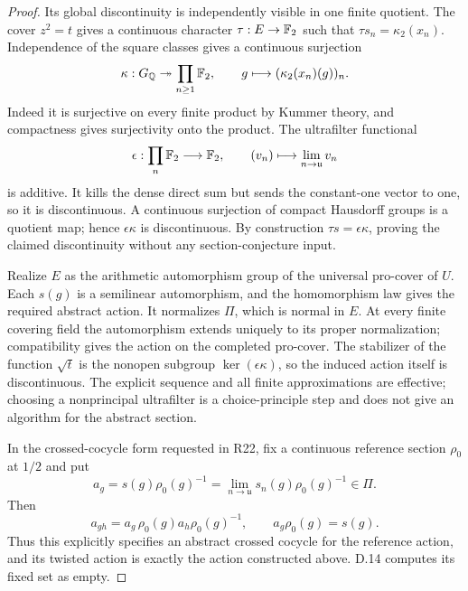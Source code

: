 \begin{proof}
Its global discontinuity is independently visible in one
finite quotient. The cover $z^2=t$ gives a continuous character
$\tau:E\to\mathbb F_2$ such that
$\tau s_n=\kappa_2(x_n)$. Independence of the square classes
gives a continuous surjection
\[
 \kappa:G_\mathbb Q\twoheadrightarrow\prod_{n\geq1}\mathbb F_2,
                 \qquad g\longmapsto(\kappa_2(x_n)(g))_n.
\]
Indeed it is surjective on every finite product by Kummer
theory, and compactness gives surjectivity onto the product.
The ultrafilter functional
\[
 \epsilon:\prod_n\mathbb F_2\longrightarrow\mathbb F_2,
              \qquad (v_n)\longmapsto\lim_{n\to\mathfrak u}v_n
\]
is additive. It kills the dense direct sum but sends the
constant-one vector to one, so it is discontinuous. A
continuous surjection of compact Hausdorff groups is a
quotient map; hence $\epsilon\kappa$ is discontinuous.
By construction $\tau s=\epsilon\kappa$, proving the
claimed discontinuity without any section-conjecture input.

Realize $E$ as the arithmetic automorphism group of the
universal pro-cover of $U$. Each $s(g)$ is a semilinear
automorphism, and the homomorphism law gives the required
abstract action. It normalizes $\Pi$, which is normal in
$E$. At every finite covering field the automorphism extends
uniquely to its proper normalization; compatibility gives
the action on the completed pro-cover. The stabilizer of the
function $\sqrt t$ is the nonopen subgroup
$\ker(\epsilon\kappa)$, so the induced action itself is
discontinuous. The explicit sequence and all finite
approximations are effective; choosing a nonprincipal
ultrafilter is a choice-principle step and does not give an
algorithm for the abstract section.

In the crossed-cocycle form requested in R22, fix a continuous
reference section $\rho_0$ at $1/2$ and put
\[
 a_g=s(g)\rho_0(g)^{-1}
     =\lim_{n\to\mathfrak u}s_n(g)\rho_0(g)^{-1}\in\Pi.
\]
Then
\[
 a_{gh}=a_g\,\rho_0(g)a_h\rho_0(g)^{-1},
                 \qquad a_g\rho_0(g)=s(g).
\]
Thus this explicitly specifies an abstract crossed cocycle
for the reference action, and its twisted action is exactly
the action constructed above. D.14 computes its fixed set
as empty.
\end{proof}


